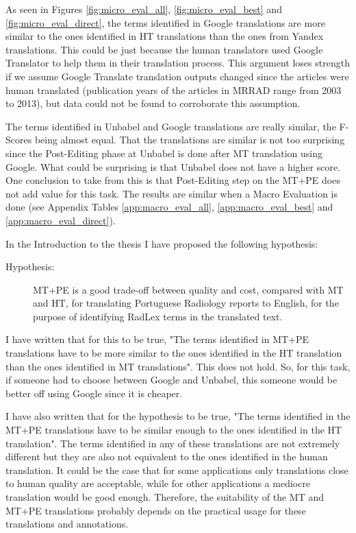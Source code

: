 As seen in Figures \ref{fig:micro_eval_all}, \ref{fig:micro_eval_best} and \ref{fig:micro_eval_direct}, the terms identified in Google translations are more similar to the ones identified in HT translations than the ones from Yandex translations. This could be just because the human translators used Google Translator to help them in their translation process. This argument loses strength if we assume Google Translate translation outputs changed since the articles were human translated (publication years of the articles in MRRAD range from 2003 to 2013), but data could not be found to corroborate this assumption. 

The terms identified in Unbabel and Google translations are really similar, the F-Scores being almost equal. That the translations are similar is not too surprising since the Post-Editing phase at Unbabel is done after MT translation using Google. What could be surprising is that Unbabel does not have a higher score. One conclusion to take from this is that Post-Editing step on the MT+PE does not add value for this task. The results are similar when a Macro Evaluation is done (see Appendix Tables \ref{app:macro_eval_all}, \ref{app:macro_eval_best} and \ref{app:macro_eval_direct}).

In the Introduction to the thesis I have proposed the following hypothesis:

\begin{description}
	\item[Hypothesis:] MT+PE is a good trade-off between quality and cost, compared with MT and HT, for translating Portuguese Radiology reports to English, for the purpose of identifying RadLex terms in the translated text. 
\end{description}

I have written that for this to be true, "The terms identified in MT+PE translations have to be more similar to the ones identified in the HT translation than the ones identified in MT translations". This does not hold. So, for this task, if someone had to choose between Google and Unbabel, this someone would be better off using Google since it is cheaper. 

I have also written that for the hypothesis to be true, "The terms identified in the MT+PE translations have to be similar enough to the ones identified in the HT translation". The terms identified in any of these translations are not extremely different but they are also not equivalent to the ones identified in the human translation. It could be the case that for some applications only translations close to human quality are acceptable, while for other applications a mediocre translation would be good enough. Therefore, the suitability of the MT and MT+PE translations probably depends on the practical usage for these translations and annotations. 

